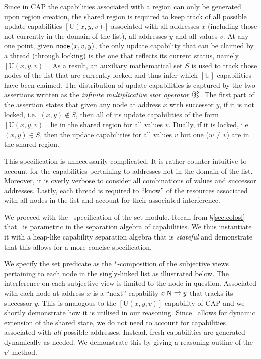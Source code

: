 Since in CAP the capabilities associated with a region can only be generated upon region creation, the shared region is required to keep track of all possible update capabilities $[\text{U}(x, y, v)]$ associated with all addresses $x$ (including those not currently in the domain of the list), all addresses $y$ and all values $v$. At any one point, given $\textsf{node}\left(x, v, y\right)$, the only update capability that can be claimed by a thread (through locking) is the one that reflects its current status, namely $[\text{U}(x, y, v)]$. As a result, an auxiliary mathematical set $S$ is used to track those nodes of the list that are currently locked and thus infer which $[\text{U}]$ capabilities have been claimed. The distribution of update capabilities is captured by the two assertions written as the \emph{infinite multiplicative star operator} $\iterStar$. The first part of the assertion states that given any node at address $x$ with successor $y$, if it is not locked, i.e.\ $(x, y) \not\in S$, then {all} of its update capabilities of the form $[\text{U}(x, y, v)]$ lie in the shared region for {all} values $v$. Dually, if it is locked, i.e.\ $(x, y) \in S$, then the update capabilities for {all} values $v$ {but one} ($w \not= v$) are in the shared region.

This specification is unnecessarily complicated. It is rather counter-intuitive to account for the capabilities pertaining to addresses not in the domain of the list. Moreover, it is overly verbose to consider all combinations of values and successor addresses. Lastly, each thread is required to ``know'' of the resources associated with all nodes in the list and account for their associated interference. 

%
We proceed with the \colosl\ specification of the set module. Recall from \S\ref{sec:colosl} that \colosl\ is parametric in the separation algebra of capabilities. We thus instantiate it with a heap-like capability separation algebra that is \emph{stateful} and demonstrate that this allows for a more concise specification.  

We specify the set predicate as the $*$-composition of the subjective views pertaining to each node in the singly-linked list as illustrated below. The interference on each subjective view is limited to the node in question. Associated with each node at address $x$ is a ``next'' capability $\nextC{x}{y}$ that tracks its successor $y$. This is analogous to the $[\text{U}(x, y, v)]$ capability of CAP and we shortly demonstrate how it is utilised in our reasoning. Since \colosl\ allows for {dynamic} extension of the shared state, we do not need to account for capabilities associated with \emph{all} possible addresses. Instead, fresh capabilities are generated dynamically as needed. We demonstrate this by giving a reasoning outline of the $v'$\li{)} method. 

